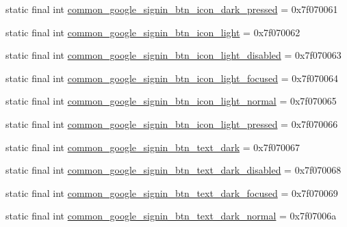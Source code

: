 \begin{DoxyCompactItemize}
\item 
static final int \mbox{\hyperlink{classcom_1_1google_1_1android_1_1gms_1_1R_1_1drawable_a8db3c8fbf3c1b0efd337cb923aa58d27}{common\+\_\+google\+\_\+signin\+\_\+btn\+\_\+icon\+\_\+dark\+\_\+pressed}} = 0x7f070061
\item 
static final int \mbox{\hyperlink{classcom_1_1google_1_1android_1_1gms_1_1R_1_1drawable_ab2f07a3fe6553887835871bfa3eb065b}{common\+\_\+google\+\_\+signin\+\_\+btn\+\_\+icon\+\_\+light}} = 0x7f070062
\item 
static final int \mbox{\hyperlink{classcom_1_1google_1_1android_1_1gms_1_1R_1_1drawable_a18479b88c365e3dd593dcb824cd525de}{common\+\_\+google\+\_\+signin\+\_\+btn\+\_\+icon\+\_\+light\+\_\+disabled}} = 0x7f070063
\item 
static final int \mbox{\hyperlink{classcom_1_1google_1_1android_1_1gms_1_1R_1_1drawable_aeb0dff036a5fa00daea35b4aed83ea5b}{common\+\_\+google\+\_\+signin\+\_\+btn\+\_\+icon\+\_\+light\+\_\+focused}} = 0x7f070064
\item 
static final int \mbox{\hyperlink{classcom_1_1google_1_1android_1_1gms_1_1R_1_1drawable_a8aed366e3cc4ed016b6ec38031c8e5b4}{common\+\_\+google\+\_\+signin\+\_\+btn\+\_\+icon\+\_\+light\+\_\+normal}} = 0x7f070065
\item 
static final int \mbox{\hyperlink{classcom_1_1google_1_1android_1_1gms_1_1R_1_1drawable_a555d67548525b658bc07a7a5fab37072}{common\+\_\+google\+\_\+signin\+\_\+btn\+\_\+icon\+\_\+light\+\_\+pressed}} = 0x7f070066
\item 
static final int \mbox{\hyperlink{classcom_1_1google_1_1android_1_1gms_1_1R_1_1drawable_ad274a3671161627455a82557b6080765}{common\+\_\+google\+\_\+signin\+\_\+btn\+\_\+text\+\_\+dark}} = 0x7f070067
\item 
static final int \mbox{\hyperlink{classcom_1_1google_1_1android_1_1gms_1_1R_1_1drawable_acab4fd2d0776ceda2e94dbd704a5a209}{common\+\_\+google\+\_\+signin\+\_\+btn\+\_\+text\+\_\+dark\+\_\+disabled}} = 0x7f070068
\item 
static final int \mbox{\hyperlink{classcom_1_1google_1_1android_1_1gms_1_1R_1_1drawable_aa04220de30e98dc2d8c5e9a542f528fe}{common\+\_\+google\+\_\+signin\+\_\+btn\+\_\+text\+\_\+dark\+\_\+focused}} = 0x7f070069
\item 
static final int \mbox{\hyperlink{classcom_1_1google_1_1android_1_1gms_1_1R_1_1drawable_a72c49c10812620ed12e5df6a9a320c37}{common\+\_\+google\+\_\+signin\+\_\+btn\+\_\+text\+\_\+dark\+\_\+normal}} = 0x7f07006a
\item 

\end{DoxyCompactItemize}
